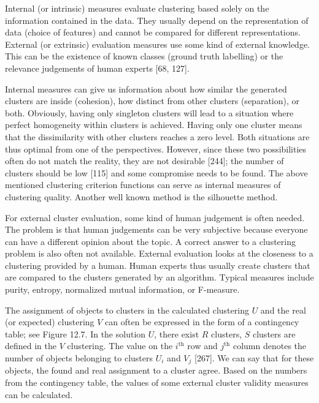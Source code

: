 \documentclass[11pt,openany,executivepaper]{book}
\begin{document}
Internal (or intrinsic) measures evaluate clustering based solely on the information contained in the data. They usually depend on the representation of data (choice of features) and cannot be compared for different representations. External (or extrinsic) evaluation measures use some kind of external knowledge. This can be the existence of known classes (ground truth labelling) or the relevance judgements of human experts [68, 127].

Internal measures can give us information about how similar the generated
clusters are inside (cohesion), how distinct from other clusters (separation), or both. Obviously, having only singleton clusters will lead to a situation where perfect homogeneity within clusters is achieved. Having only one cluster means that the dissimilarity with other clusters reaches a zero level. Both situations are thus optimal from one of the perspectives. However, since these two possibilities often do not match the reality, they are not desirable [244]; the number of clusters should be low [115] and some compromise needs to be found. The above mentioned clustering criterion functions can serve as internal measures of clustering quality. Another well known method is the silhouette method.

For external cluster evaluation, some kind of human judgement is often
needed. The problem is that human judgements can be very subjective because
everyone can have a different opinion about the topic. A correct answer to a clustering problem is also often not available. External evaluation looks at the closeness to a clustering provided by a human. Human experts thus usually create clusters that are compared to the clusters generated by an algorithm. Typical measures include purity, entropy, normalized mutual information, or F-measure.

The assignment of objects to clusters in the calculated clustering $U$ and the real (or expected) clustering $V$ can often be expressed in the form of a contingency table; see Figure 12.7. In the solution $U$, there exist $R$ clusters, $S$ clusters are defined in the $V$ clustering. The value on the $i^{\text{th}}$ row and $j^{\text{th}}$ column denotes the number of objects belonging to clusters $U_i$ and $V_j$ [267]. We can say that for these objects, the found and real assignment to a cluster agree. Based on the numbers from the contingency table, the values of some external cluster validity measures can be calculated.
\end{document}
